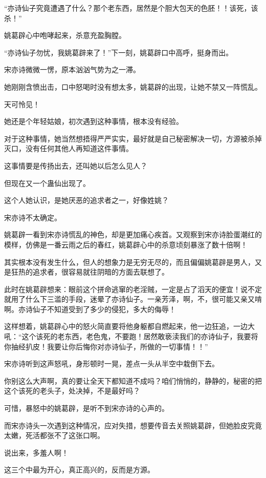 \begin{this_body}
“亦诗仙子究竟遭遇了什么？那个老东西，居然是个胆大包天的色胚！！该死，该杀！”

姚葛辟心中咆哮起来，杀意充盈胸膛。

“亦诗仙子勿忧，我姚葛辟来了！”下一刻，姚葛辟口中高呼，挺身而出。

宋亦诗微微一愣，原本汹汹气势为之一滞。

她刚刚含愤出击，口中怒喝时没有想太多，姚葛辟的出现，让她不禁又一阵慌乱。

天可怜见！

她还是个年轻姑娘，初次遇到这种事情，根本没有经验。

对于这种事情，她当然想捂得严严实实，最好就是自己秘密解决一切，方源被杀掉灭口，没有任何其他人再知道这件事情。

这事情要是传扬出去，还叫她以后怎么见人？

但现在又一个蛊仙出现了。

这个人她认识，是她厌恶的追求者之一，好像姓姚？

宋亦诗不太确定。

姚葛辟一看到宋亦诗慌乱的神色，却是更加痛心疾首。又观察到宋亦诗脸蛋潮红的模样，仿佛是一番云雨之后的春红，姚葛辟心中的杀意顷刻暴涨了数十倍啊！

其实根本没有发生什么，但人的想象力是无穷无尽的，而且偏偏姚葛辟是男人，又是狂热的追求者，很容易就往阴暗的方面去联想了。

此时在姚葛辟想来：眼前这个拼命逃窜的老淫贼，一定是占了滔天的便宜！说不定就用了什么下三滥的手段，迷晕了亦诗仙子。一亲芳泽，啊，不，很可能又亲又啃啊。亦诗仙子不知道受到了多少的侵犯，多大的侮辱！

这样想着，姚葛辟心中的怒火简直要将他身躯都自燃起来，他一边狂追，一边大吼：“这个该死的老东西，老色鬼，不要跑！居然敢亵渎我们的亦诗仙子，我要将你抽经扒皮！我要让你后悔你对亦诗仙子，所做的一切事情！！”

宋亦诗听到这声怒吼，身形顿时一晃，差点一头从半空中栽倒下去。

你别这么大声啊，真的要让全天下都知道不成吗？咱们悄悄的，静静的，秘密的把这个该死的老头子，处决掉，不是最好吗？

可惜，暴怒中的姚葛辟，是听不到宋亦诗的心声的。

而宋亦诗头一次遇到这种情况，应对失措，想要传音去关照姚葛辟，但她脸皮究竟太嫩，死活都张不了这张口啊。

说出来，多羞人啊！

这三个中最为开心，真正高兴的，反而是方源。


\end{this_body}
